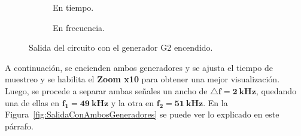     \begin{figure}[H]
      \centering
      \begin{subfigure}[H]{0.48\textwidth}
        \caption{En tiempo.}
      \end{subfigure}
      \hfill 
      \begin{subfigure}[H]{0.48\textwidth}
        \caption{En frecuencia.}
      \end{subfigure}

      \caption{Salida del circuito con el generador G2 encendido.}
      \label{fig:SalidaCircuitConG2Encendido}
    \end{figure}

    A continuación, se encienden ambos generadores y se ajusta el tiempo de muestreo y se habilita el \textbf{Zoom x10}
    para obtener una mejor visualización. Luego, se procede a separar ambas señales un ancho de $\mathbf{\triangle f=  2~kHz}$,
    quedando una de ellas en $\mathbf{f_1=49~kHz}$ y la otra en $\mathbf{f_2=51~kHz}$. En la
    Figura~\ref{fig:SalidaConAmbosGeneradores} se puede ver lo explicado en este párrafo.

